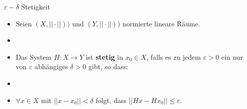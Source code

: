 \documentclass[14pt, aspectratio=169, handout]{beamer}
\begin{document}
\begin{frame}{$\varepsilon-\delta$ Stetigkeit}
    \begin{itemize}
        \item Seien $(X, ||\cdot||))$ und $(Y, ||\cdot||))$ normierte lineare Räume.
        \item[] 
        \item[] Das System $H:X \to Y$ ist \textbf{stetig} in $x_0 \in X$, falls es zu jedem $\varepsilon > 0$ ein nur von $\varepsilon$ abhängiges $\delta >0$ gibt, so dass:
        \item[] 
        \item[] $\forall x\in X$ mit $||x-x_0||<\delta$ folgt, dass $||Hx-Hx_0||\leq \varepsilon$.
    \end{itemize}
\end{frame}
\end{document}
